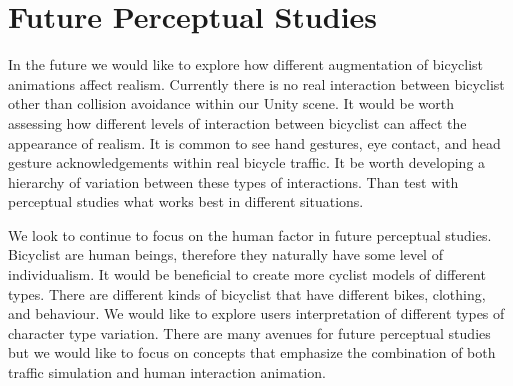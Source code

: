 \documentclass[paper=a4, fontsize=11pt]{scrartcl} %
\begin{document}
\section*{Future Perceptual Studies}

In the future we would like to explore how different augmentation of bicyclist animations affect realism.  Currently there is no real interaction between bicyclist other than collision avoidance within our Unity scene.  It would be worth assessing how different levels of interaction between bicyclist can affect the appearance of realism.  It is common to see hand gestures, eye contact, and head gesture acknowledgements within real bicycle traffic.  It be worth developing a hierarchy of variation between these types of interactions.  Than test with perceptual studies what works best in different situations.

We look to continue to focus on the human factor in future perceptual studies.  Bicyclist are human beings, therefore they naturally have some level of individualism.  It would be beneficial to create more cyclist models of different types.  There are different kinds of bicyclist that have different bikes, clothing, and behaviour.  We would like to explore users interpretation of different types of character type variation.   There are many avenues for future perceptual studies but we would like to focus on concepts that emphasize the combination of both traffic simulation and human interaction animation.



\end{document}

